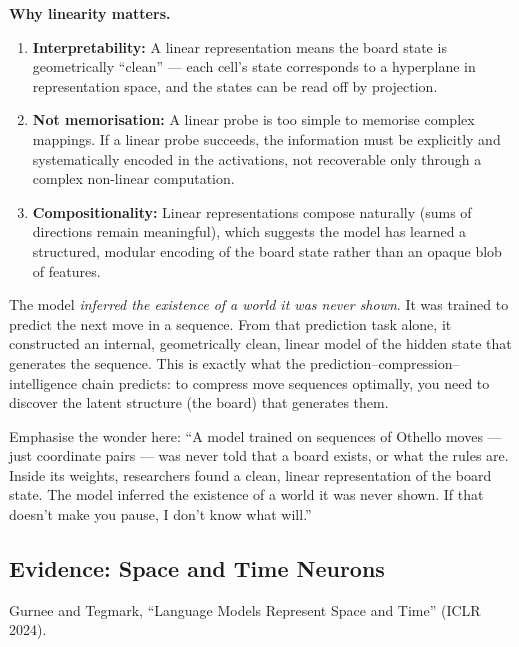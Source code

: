 \documentclass[11pt, a4paper]{article}
\begin{document}
\textbf{Why linearity matters.}
\begin{enumerate}[leftmargin=2em]
  \item \textbf{Interpretability:} A linear representation means the
    board state is geometrically ``clean'' --- each cell's state
    corresponds to a hyperplane in representation space, and the states
    can be read off by projection.
  \item \textbf{Not memorisation:} A linear probe is too simple to
    memorise complex mappings. If a linear probe succeeds, the
    information must be explicitly and systematically encoded in the
    activations, not recoverable only through a complex non-linear
    computation.
  \item \textbf{Compositionality:} Linear representations compose
    naturally (sums of directions remain meaningful), which suggests the
    model has learned a structured, modular encoding of the board state
    rather than an opaque blob of features.
\end{enumerate}

\begin{keyinsight}
The model \emph{inferred the existence of a world it was never shown}.
It was trained to predict the next move in a sequence. From that
prediction task alone, it constructed an internal, geometrically clean,
linear model of the hidden state that generates the sequence. This is
exactly what the prediction--compression--intelligence chain predicts:
to compress move sequences optimally, you need to discover the latent
structure (the board) that generates them.
\end{keyinsight}

\begin{speakingnote}
Emphasise the wonder here: ``A model trained on sequences of Othello
moves --- just coordinate pairs --- was never told that a board exists,
or what the rules are. Inside its weights, researchers found a clean,
linear representation of the board state. The model inferred the existence
of a world it was never shown. If that doesn't make you pause, I don't
know what will.''
\end{speakingnote}


\subsection{Evidence: Space and Time Neurons}

Gurnee and Tegmark, ``Language Models Represent Space and Time'' (ICLR 2024).
\end{document}

